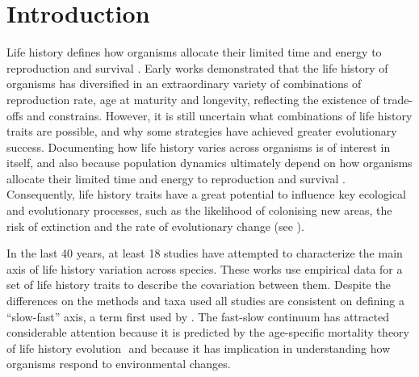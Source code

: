 \section{Introduction}

Life history defines how organisms allocate their limited time and energy to
reproduction and survival \citep{stearns1992evolution}. Early works demonstrated
that the life history of organisms has diversified in an extraordinary variety
of combinations of reproduction rate, age at maturity and longevity, reflecting
the existence of trade-offs and constrains. However, it is  still uncertain
what combinations of life history traits are possible, and why some strategies
have achieved greater evolutionary success. Documenting how life history
varies across organisms is of interest in itself, and also because population
dynamics ultimately depend on how organisms allocate their limited time and
energy to reproduction and survival \citep{stearns1992evolution}. Consequently,
life history traits have a great potential to influence key ecological and
evolutionary processes, such as the likelihood of colonising new areas, the risk
of extinction and the rate of evolutionary change (see
\citet{stearns1992evolution,roff1992evolution,roff2002}).

In the last 40 years, at least 18 studies have attempted to characterize the
main axis of life history variation across species. These works use empirical
data for a set of life history traits to describe the covariation between them.
Despite the differences on the methods and taxa used all studies are consistent
on defining a “slow-fast” axis, a term first used by \citet{Stearns1983a}.
The fast-slow continuum has attracted considerable attention because it is
predicted by the age-specific mortality theory of life history evolution
\citep{Stearns1977,Charlesworth1980}⁠ and because it has implication in
understanding how organisms respond to environmental changes.

